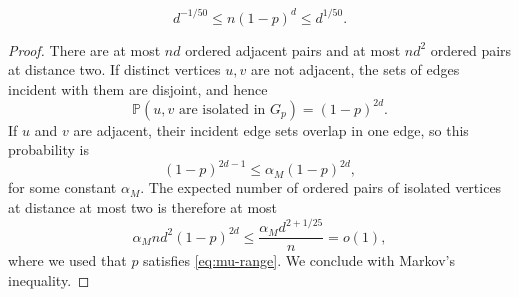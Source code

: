 \documentclass[10pt,a4paper]{amsart}
\begin{document}
\begin{equation}\label{eq:mu-range}
  d^{-1/50}\le n(1-p)^d\le d^{1/50}.
\end{equation}

\begin{proof}
There are at most $nd$ ordered adjacent pairs and at most $nd^2$ ordered pairs at distance two.
If distinct vertices $u,v$ are not adjacent, the sets of edges incident with them are disjoint, and hence
\[
  \mathbb{P}(u,v\text{ are isolated in }G_p)=(1-p)^{2d}.
\]
If $u$ and $v$ are adjacent, their incident edge sets overlap in one edge, so this probability is
\[
  (1-p)^{2d-1}\le \alpha_M(1-p)^{2d},
\]
for some constant $\alpha_M$.
The expected number of ordered pairs of isolated vertices at distance at most two is therefore at most
\[
  \alpha_M nd^2(1-p)^{2d}   \le \frac{\alpha_M d^{2+1/25}}{n}=o(1),
\]
where we used that $p$ satisfies \eqref{eq:mu-range}.
We conclude with Markov's inequality.
\end{proof}
\end{document}
